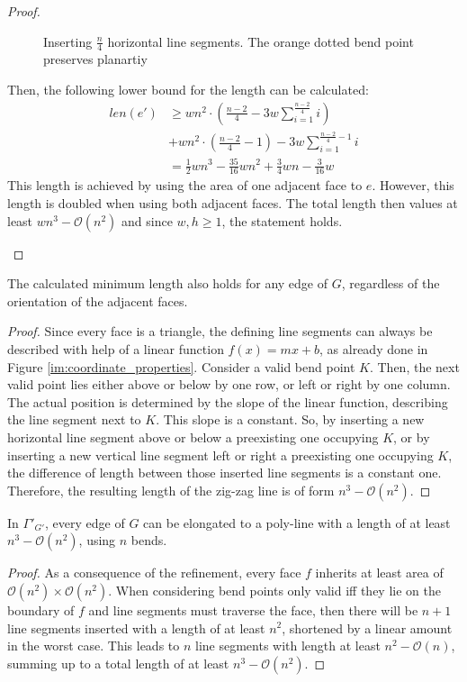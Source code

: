 \begin{proof}
\begin{itemize}
\begin{figure}[H]
\begin{subfigure}{0.6\linewidth}
		\end{subfigure}
		\caption{Inserting $\frac{n}{4}$ horizontal line segments. The orange dotted bend point preserves planartiy}\label{im:horizontal_one_face}
	\end{figure}
	Then, the following lower bound for the length can be calculated:
	\begin{align}
		len(e') &\geq wn^2\cdot\left(\frac{n-2}{4}-3w\sum_{i = 1}^{\frac{n-2}{4}}i\right)\label{eq:horizontals}\\
		&+ wn^2\cdot \left(\frac{n-2}{4}-1\right)-3w\sum_{i=1}^{\frac{n-2}{4}-1}i\\
		&= \frac{1}{2}wn^3-\frac{35}{16}wn^2+\frac{3}{4}wn-\frac{3}{16}w
	\end{align}		
	This length is achieved by using the area of one adjacent face to $e$. However, this length is doubled when using both adjacent faces. The total length then values at least $wn^3-\mathcal{O}(n^2)$ and since  $w,h\geq1$, the statement holds.
	\end{itemize}
\end{proof}

\bigskip
\begin{lemma}
	The calculated minimum length also holds for any edge of $G$, regardless of the orientation of the adjacent faces.
\end{lemma}
\begin{proof}
	Since every face is a triangle, the defining line segments can always be described with help of a linear function $f(x)=mx+b$, as already done in Figure \ref{im:coordinate_properties}. Consider a valid bend point $K$. Then, the next valid point lies either above or below by one row, or left or right by one column. The actual position is determined by the slope of the linear function, describing the line segment next to $K$. This slope is a constant. So, by inserting a new horizontal line segment above or below a preexisting one occupying $K$, or by inserting a new vertical line segment left or right a preexisting one occupying $K$, the difference of length between those inserted line segments is a constant one. Therefore, the resulting length of the zig-zag line is of form $n^3-\mathcal{O}(n^2)$.
\end{proof}
\begin{theorem}\label{theorem:minimum-polyline-length}
\end{theorem}
In $\Gamma'_{G'}$, every edge of $G$ can be elongated to a poly-line with a length of at least $n^3 - \mathcal{O}(n^2)$, using $n$ bends.
\begin{proof}
	As a consequence of the refinement, every face $f$ inherits at least area of $\mathcal{O}(n^2)\times\mathcal{O}(n^2)$. When considering bend points only valid iff they lie on the boundary of $f$ and line segments must traverse the face, then there will be $n+1$ line segments inserted with a length of at least $n^2$, shortened by a linear amount in the worst case. This leads to $n$ line segments with length at least $n^2 - \mathcal{O}(n)$, summing up to a total length of at least $n^3-\mathcal{O}(n^2)$.
\end{proof}
